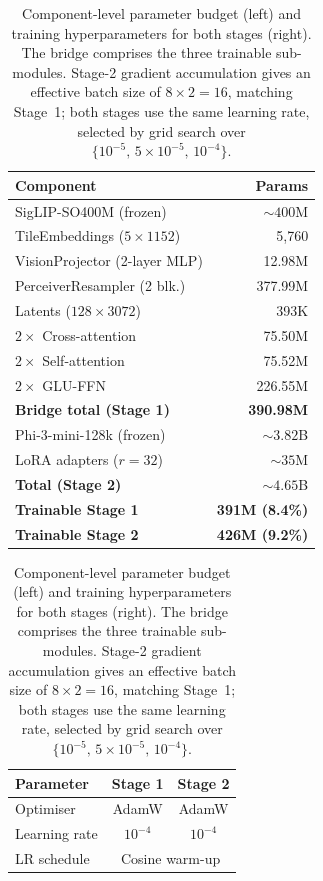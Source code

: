 \documentclass[runningheads]{llncs}
\begin{document}
\begin{table}[h]
\centering
\caption{Component-level parameter budget (left) and training
  hyperparameters for both stages (right). The bridge comprises the three
  trainable sub-modules. Stage-2 gradient accumulation gives an effective
  batch size of $8\times2=16$, matching Stage~1; both stages use the same
  learning rate, selected by grid search over
  $\{10^{-5},\,5\times10^{-5},\,10^{-4}\}$.}
\label{tab:params}
\setlength{\tabcolsep}{2.5pt}
\scriptsize
\begin{minipage}[t]{0.50\textwidth}
\centering
\begin{tabular}{@{}lr@{}}
\toprule
\textbf{Component} & \textbf{Params} \\
\midrule
SigLIP-SO400M (frozen) & ${\sim}400$M \\
\midrule
TileEmbeddings ($5{\times}1152$) & 5{,}760 \\
VisionProjector (2-layer MLP) & 12.98M \\
PerceiverResampler (2 blk.) & 377.99M \\
\quad Latents ($128{\times}3072$) & 393K \\
\quad $2\times$ Cross-attention & 75.50M \\
\quad $2\times$ Self-attention & 75.52M \\
\quad $2\times$ GLU-FFN & 226.55M \\
\textbf{Bridge total (Stage 1)} & \textbf{390.98M} \\
\midrule
Phi-3-mini-128k (frozen) & ${\sim}3.82$B \\
LoRA adapters ($r{=}32$) & ${\sim}35$M \\
\midrule
\textbf{Total (Stage 2)} & ${\sim}4.65$B \\
\textbf{Trainable Stage 1} & \textbf{391M (8.4\%)} \\
\textbf{Trainable Stage 2} & \textbf{426M (9.2\%)} \\
\bottomrule
\end{tabular}
\end{minipage}\hfill
\begin{minipage}[t]{0.48\textwidth}
\centering
\begin{tabular}{@{}lcc@{}}
\toprule
\textbf{Parameter} & \textbf{Stage 1} & \textbf{Stage 2} \\
\midrule
Optimiser              & AdamW & AdamW \\
Learning rate          & $10^{-4}$ & $10^{-4}$ \\
LR schedule            & \multicolumn{2}{c}{Cosine warm-up} \\

\end{tabular}
\end{minipage}
\end{table}
\end{document}
